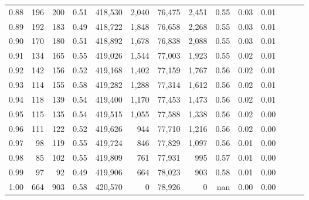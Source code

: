 \begin{tabular}{rrrrrrrrrrrrrr}
0.88 &     196 &    200 &  0.51 &  418,530 &    2,040 &  76,475 &   2,451 &  0.55 &  0.03 &      0.01 \\
0.89 &     192 &    183 &  0.49 &  418,722 &    1,848 &  76,658 &   2,268 &  0.55 &  0.03 &      0.01 \\
0.90 &     170 &    180 &  0.51 &  418,892 &    1,678 &  76,838 &   2,088 &  0.55 &  0.03 &      0.01 \\
0.91 &     134 &    165 &  0.55 &  419,026 &    1,544 &  77,003 &   1,923 &  0.55 &  0.02 &      0.01 \\
0.92 &     142 &    156 &  0.52 &  419,168 &    1,402 &  77,159 &   1,767 &  0.56 &  0.02 &      0.01 \\
0.93 &     114 &    155 &  0.58 &  419,282 &    1,288 &  77,314 &   1,612 &  0.56 &  0.02 &      0.01 \\
0.94 &     118 &    139 &  0.54 &  419,400 &    1,170 &  77,453 &   1,473 &  0.56 &  0.02 &      0.01 \\
0.95 &     115 &    135 &  0.54 &  419,515 &    1,055 &  77,588 &   1,338 &  0.56 &  0.02 &      0.00 \\
0.96 &     111 &    122 &  0.52 &  419,626 &      944 &  77,710 &   1,216 &  0.56 &  0.02 &      0.00 \\
0.97 &      98 &    119 &  0.55 &  419,724 &      846 &  77,829 &   1,097 &  0.56 &  0.01 &      0.00 \\
0.98 &      85 &    102 &  0.55 &  419,809 &      761 &  77,931 &     995 &  0.57 &  0.01 &      0.00 \\
0.99 &      97 &     92 &  0.49 &  419,906 &      664 &  78,023 &     903 &  0.58 &  0.01 &      0.00 \\
1.00 &     664 &    903 &  0.58 &  420,570 &        0 &  78,926 &       0 &   nan &  0.00 &      0.00 \\
\bottomrule
\end{tabular}
